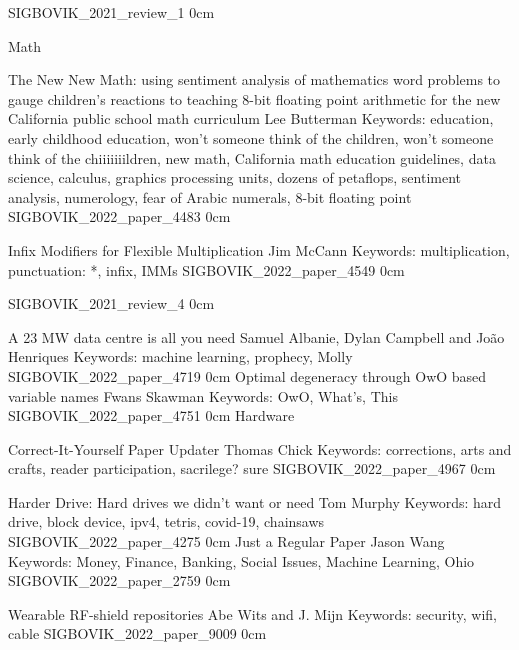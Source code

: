 \addreview
    {SIGBOVIK_2021_review_1}
    {0cm}

\addtrack
    {}{Math}


\addpaper
    {The New New Math: using sentiment analysis of mathematics word problems to gauge children's reactions to teaching 8-bit floating point arithmetic for the new California public school math curriculum}
    {Lee Butterman}
    {Keywords: education, early childhood education, won't someone think of the children, won't someone think of the chiiiiiiildren, new math, California math education guidelines, data science, calculus, graphics processing units, dozens of petaflops, sentiment analysis, numerology, fear of Arabic numerals, 8-bit floating point}
    {SIGBOVIK_2022_paper_4483}
    {0cm}
    {}

\addpaper
    {Infix Modifiers for Flexible Multiplication}
    {Jim McCann}
    {Keywords: multiplication, punctuation: *, infix, IMMs}
    {SIGBOVIK_2022_paper_4549}
    {0cm}
    {}

\addreview
    {SIGBOVIK_2021_review_4}
    {0cm}


\addpaper
    {A 23 MW data centre is all you need}
    {Samuel Albanie, Dylan Campbell and João Henriques}
    {Keywords: machine learning, prophecy, Molly}
    {SIGBOVIK_2022_paper_4719}
    {0cm}
    {}
\addpaper
    {Optimal degeneracy through OwO based variable names}
    {Fwans Skawman}
    {Keywords: OwO, What's, This}
    {SIGBOVIK_2022_paper_4751}
    {0cm}
    {}
\addtrack
    {}{Hardware}

\addpaper
    {Correct-It-Yourself Paper Updater}
    {Thomas Chick}
    {Keywords: corrections, arts and crafts, reader participation, sacrilege? sure}
    {SIGBOVIK_2022_paper_4967}
    {0cm}
    {}

\addpaper
    {Harder Drive: Hard drives we didn't want or need}
    {Tom Murphy}
    {Keywords: hard drive, block device, ipv4, tetris, covid-19, chainsaws}
    {SIGBOVIK_2022_paper_4275}
    {0cm}
    {}
\addpaper
    {Just a Regular Paper}
    {Jason Wang}
    {Keywords: Money, Finance, Banking, Social Issues, Machine Learning, Ohio}
    {SIGBOVIK_2022_paper_2759}
    {0cm}
    {}


\addpaper
    {Wearable RF-shield repositories}
    {Abe Wits and J. Mijn}
    {Keywords: security, wifi, cable}
    {SIGBOVIK_2022_paper_9009}
    {0cm}
    {}


